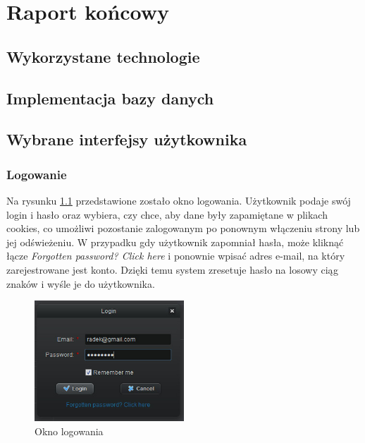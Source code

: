\chapter{Raport końcowy}
\label{cha:raport}

\section{Wykorzystane technologie}
\label{sec:technologie}



\section{Implementacja bazy danych}
\label{sec:impldb}



\section{Wybrane interfejsy użytkownika}
\label{sec:interfejsy}

\subsection{Logowanie}
\label{sec:login}
Na rysunku \ref{fig:login} przedstawione zostało okno logowania. Użytkownik podaje swój login i hasło oraz wybiera, czy chce, aby dane były zapamiętane w plikach cookies, co umożliwi pozostanie zalogowanym po ponownym włączeniu strony lub jej odświeżeniu. W przypadku gdy użytkownik zapomniał hasła, może kliknąć łącze \emph{Forgotten password? Click here} i ponownie wpisać adres e-mail, na który zarejestrowane jest konto. Dzięki temu system zresetuje hasło na losowy ciąg znaków i wyśle je do użytkownika.

\begin{figure}[h!]	
\centering
\includegraphics[width=0.5\textwidth]{./img/interfejsy/login2}
\caption{Okno logowania}
\label{fig:login}
\end{figure}

